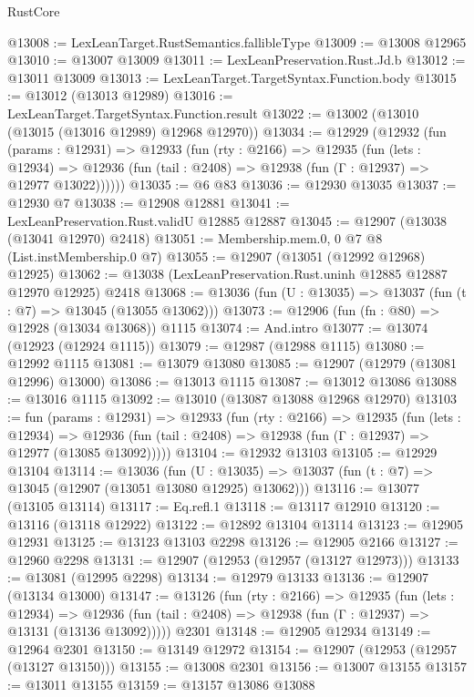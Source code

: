 \begin{lexlean}{RustCore}
\begin{coremodule}
@13008 := LexLeanTarget.RustSemantics.fallibleType
@13009 := @13008 @12965
@13010 := @13007 @13009
@13011 := LexLeanPreservation.Rust.Jd.b
@13012 := @13011 @13009
@13013 := LexLeanTarget.TargetSyntax.Function.body
@13015 := @13012 (@13013 @12989)
@13016 := LexLeanTarget.TargetSyntax.Function.result
@13022 := @13002 (@13010 (@13015 (@13016 @12989) @12968 @12970))
@13034 := @12929
    (@12932
      (fun (params : @12931) =>
      @12933
        (fun (rty : @2166) =>
        @12935
          (fun (lets : @12934) =>
          @12936 (fun (tail : @2408) => @12938 (fun (Γ : @12937) => @12977 @13022))))))
@13035 := @6 @83
@13036 := @12930 @13035
@13037 := @12930 @7
@13038 := @12908 @12881
@13041 := LexLeanPreservation.Rust.validU @12885 @12887
@13045 := @12907 (@13038 (@13041 @12970) @2418)
@13051 := Membership.mem.{0, 0} @7 @8 (List.instMembership.{0} @7)
@13055 := @12907 (@13051 (@12992 @12968) @12925)
@13062 := @13038 (LexLeanPreservation.Rust.uninh @12885 @12887 @12970 @12925) @2418
@13068 := @13036 (fun (U : @13035) => @13037 (fun (t : @7) => @13045 (@13055 @13062)))
@13073 := @12906 (fun (fn : @80) => @12928 (@13034 @13068)) @1115
@13074 := And.intro
@13077 := @13074 (@12923 (@12924 @1115))
@13079 := @12987 (@12988 @1115)
@13080 := @12992 @1115
@13081 := @13079 @13080
@13085 := @12907 (@12979 (@13081 @12996) @13000)
@13086 := @13013 @1115
@13087 := @13012 @13086
@13088 := @13016 @1115
@13092 := @13010 (@13087 @13088 @12968 @12970)
@13103 := fun (params : @12931) =>
  @12933
    (fun (rty : @2166) =>
    @12935
      (fun (lets : @12934) =>
      @12936 (fun (tail : @2408) => @12938 (fun (Γ : @12937) => @12977 (@13085 @13092)))))
@13104 := @12932 @13103
@13105 := @12929 @13104
@13114 := @13036
    (fun (U : @13035) => @13037 (fun (t : @7) => @13045 (@12907 (@13051 @13080 @12925) @13062)))
@13116 := @13077 (@13105 @13114)
@13117 := Eq.refl.{1}
@13118 := @13117 @12910
@13120 := @13116 (@13118 @12922)
@13122 := @12892 @13104 @13114
@13123 := @12905 @12931
@13125 := @13123 @13103 @2298
@13126 := @12905 @2166
@13127 := @12960 @2298
@13131 := @12907 (@12953 (@12957 (@13127 @12973)))
@13133 := @13081 (@12995 @2298)
@13134 := @12979 @13133
@13136 := @12907 (@13134 @13000)
@13147 := @13126
    (fun (rty : @2166) =>
    @12935
      (fun (lets : @12934) =>
      @12936 (fun (tail : @2408) => @12938 (fun (Γ : @12937) => @13131 (@13136 @13092)))))
    @2301
@13148 := @12905 @12934
@13149 := @12964 @2301
@13150 := @13149 @12972
@13154 := @12907 (@12953 (@12957 (@13127 @13150)))
@13155 := @13008 @2301
@13156 := @13007 @13155
@13157 := @13011 @13155
@13159 := @13157 @13086 @13088

\end{coremodule}
\end{lexlean}
